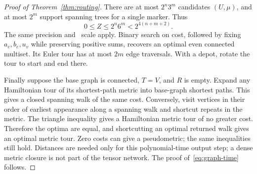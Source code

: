 \begin{proof}[Proof of Theorem~\ref{thm:routing}]
There are at most $2^n3^m$ candidates $(U,\mu)$, and at most $2^m$
support spanning trees for a single marker. Thus
\[
 0\le Z\le2^n6^m<2^{4(n+m+2)}.
\]
The same precision and \HTC\ scale apply. Binary search on cost,
followed by fixing $a_e,b_e,u_v$ while preserving positive sums,
recovers an optimal even connected multiset. Its Euler tour has at
most $2m$ edge traversals. With a depot, rotate the tour to start
and end there.

Finally suppose the base graph is connected, $T=V$, and $R$ is empty.
Expand any Hamiltonian tour of its shortest-path metric into base-graph
shortest paths. This gives a closed spanning walk of the same cost.
Conversely, visit vertices in their order of earliest appearance along a
spanning walk and shortcut repeats in the metric. The triangle
inequality gives a Hamiltonian metric tour of no greater cost.
Therefore the optima are equal, and shortcutting an optimal returned
walk gives an optimal metric tour. Zero costs can give a pseudometric;
the same inequalities still hold. Distances are needed only for this
polynomial-time output step; a dense metric closure is not part of
the tensor network. The proof of~\eqref{eq:graph-time} follows.
\end{proof}
